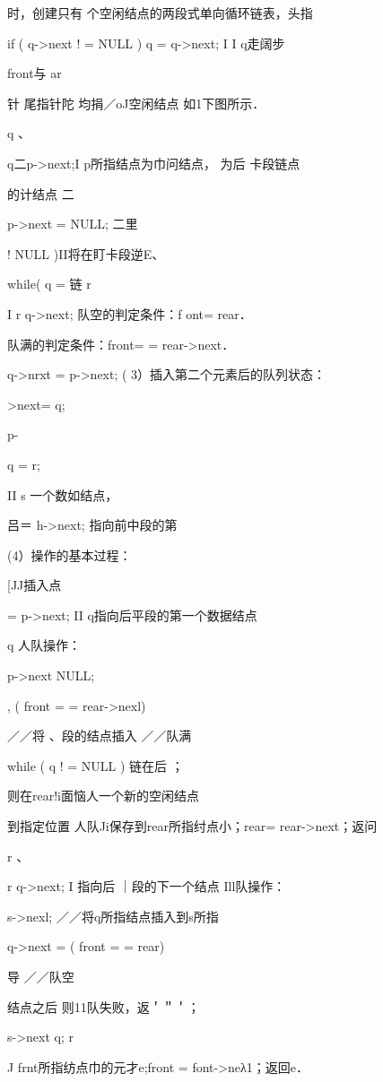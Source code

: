 {{    时，创建只有  个空闲结点的两段式单向循环链表，头指

    if ( q->next !  = NULL ) q = q->next; I I q走阔步

    front与    ar

    针    尾指针陀  均捐／oJ空闲结点  如1下图所示．

    q    、

    q二p->next;I  p所指结点为巾问结点， 为后 卡段链点

    的计结点    二

    p->next = NULL;    二里

    !    NULL )II将在盯卡段逆E、

    while( q   =     链    r

    I  r   q->next;    队空的判定条件：f ont=   rear．

    队满的判定条件：front= = rear->next．

    q->nrxt = p->next;    ( 3）插入第二个元素后的队列状态：

    >next= q;

    p-

    q = r;

    II s    一个数如结点，

    吕＝ h->next;     指向前中段的第

    (4）操作的基本过程：

    [JJ插入点

    = p->next;     II q指向后平段的第一个数据结点

    q    人队操作：

    p->next   NULL;    {, ( front = = rear->nexl)

    ／／将    、段的结点插入    ／／队满

    while ( q !  = NULL )     链在后    ；

    则在rear!i面恼人一个新的空闲结点

    到指定位置    人队Ji保存到rear所指纣点小；rear= rear->next；返问

    r    、

    r   q->next;     I   指向后 ｜段的下一个结点    Ill队操作：

    s->nexl;   ／／将q所指结点插入到s所指

    q->next =    ( front = = rear)

    导    ／／队空

    结点之后    则11队失败，返＇＂＇；

    s->next   q;    r

    J frnt所指纺点巾的元才e;front = font->neλ1；返回e．

}}}
